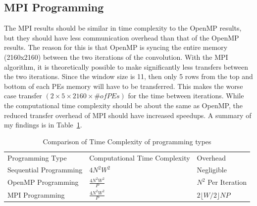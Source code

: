 \documentclass{article}
\begin{document}
\subsection*{MPI Programming}
\begin{par}
The MPI results should be similar in time complexity to the OpenMP results, but they should have less communication overhead than that of the OpenMP results.  The reason for this is that OpenMP is syncing the entire memory (2160x2160) between the two iterations of the convolution.  With the MPI algorithm, it is theoretically possible to make significantly less transfers between the two iterations.  Since the window size is 11, then only 5 rows from the top and bottom of each PEs memory will have to be transferred.  This makes the worse case transfer $(2 \times 5 \times 2160 \times \# of PEs)$ for the time between iterations.  While the computational time complexity should be about the same as OpenMP, the reduced transfer overhead of MPI should have increased speedups.  A summary of my findings is in Table~\ref{tbl:comparison}.
\end{par}

\begin{table}
\begin{tabular}[tbph]{lll }
Programming Type & Computational Time Complexity & Overhead \\
Sequential Programming & $4N^{2}W^{2}$ & Negligible \\
OpenMP Programming & $\frac{4N^{2}W^{2}}{P}$ & $N^{2}$ Per Iteration \\
MPI Programming & $\frac{4N^{2}W^{2}}{P}$ & $2  \lfloor W/2 \rfloor NP$\\
\end{tabular}
\caption{Comparison of Time Complexity of programming types}
\label{tbl:comparison}
\end{table}
\end{document}
